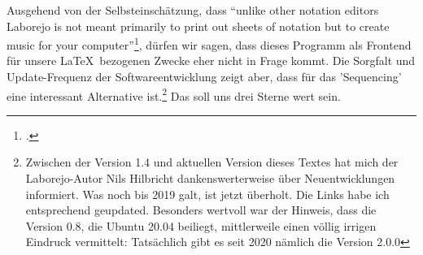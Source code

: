 Ausgehend von der Selbsteinschätzung, dass \enquote{unlike other notation editors Laborejo is not meant primarily to print out sheets of notation but to create music for your computer}\footcite[vgl.][\nopage wp.]{Hilbricht2019a}, dürfen wir sagen, dass dieses Programm als Frontend für unsere \LaTeX\ bezogenen Zwecke eher nicht in Frage kommt. Die Sorgfalt und Update-Frequenz der Softwareentwicklung zeigt aber, dass für das 'Sequencing' eine interessant Alternative ist.\footnote{Zwischen der Version 1.4 und aktuellen Version dieses Textes hat mich der Laborejo-Autor Nils Hilbricht dankenswerterweise über Neuentwicklungen informiert. Was noch bis 2019 galt, ist jetzt überholt. Die Links habe ich entsprechend geupdated. Besonders wertvoll war der Hinweis, dass die Version 0.8, die Ubuntu 20.04 beiliegt, mittlerweile einen völlig irrigen Eindruck vermittelt: Tatsächlich gibt es seit 2020 nämlich die Version 2.0.0} Das soll uns drei Sterne wert sein.
%

